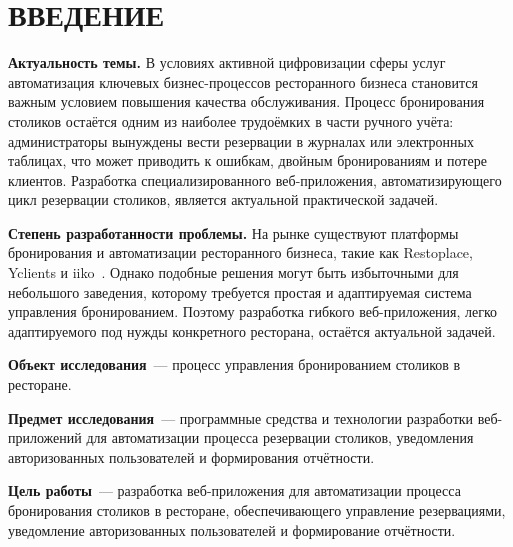 \section*{ВВЕДЕНИЕ}

\textbf{Актуальность темы.} В условиях активной цифровизации сферы услуг
автоматизация ключевых бизнес-процессов ресторанного бизнеса становится
важным условием повышения качества обслуживания. Процесс бронирования
столиков остаётся одним из наиболее трудоёмких в части ручного учёта:
администраторы вынуждены вести резервации в журналах или электронных
таблицах, что может приводить к ошибкам, двойным бронированиям и потере
клиентов. Разработка специализированного веб-приложения, автоматизирующего
цикл резервации столиков, является актуальной практической задачей.

\textbf{Степень разработанности проблемы.} На рынке существуют платформы
бронирования и автоматизации ресторанного бизнеса, такие как Restoplace,
Yclients и iiko~\cite{restoplace,yclients,iiko}. Однако подобные решения
могут быть избыточными для небольшого заведения, которому требуется
простая и адаптируемая система управления бронированием. Поэтому
разработка гибкого веб-приложения, легко адаптируемого под нужды
конкретного ресторана, остаётся актуальной задачей.

\textbf{Объект исследования}~--- процесс управления бронированием столиков
в ресторане.

\textbf{Предмет исследования}~--- программные средства и технологии
разработки веб-приложений для автоматизации процесса резервации столиков,
уведомления авторизованных пользователей и формирования отчётности.

\textbf{Цель работы}~--- разработка веб-приложения для автоматизации
процесса бронирования столиков в ресторане, обеспечивающего управление
резервациями, уведомление авторизованных пользователей и формирование отчётности.

